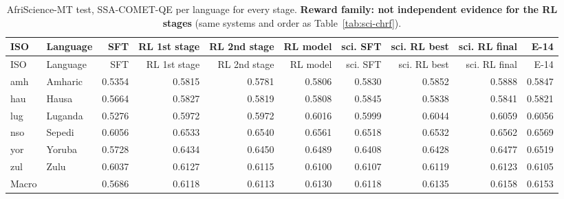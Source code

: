 {\scriptsize\setlength{\tabcolsep}{1.5pt}
\begin{longtable}{@{}llrrrrrrrr@{}}
\caption{AfriScience-MT test, SSA-COMET-QE per language for every stage. \textbf{Reward family: not independent evidence for the RL stages} (same systems and order as Table~\ref{tab:sci-chrf}).}\label{tab:sci-ssa}\\
\toprule
ISO & Language & SFT & RL 1st stage & RL 2nd stage & RL model & sci. SFT & sci. RL best & sci. RL final & E-14 \\
\midrule\endfirsthead
\toprule
ISO & Language & SFT & RL 1st stage & RL 2nd stage & RL model & sci. SFT & sci. RL best & sci. RL final & E-14 \\
\midrule\endhead
\midrule\endfoot
\bottomrule\endlastfoot
amh & Amharic & 0.5354 & 0.5815 & 0.5781 & 0.5806 & 0.5830 & 0.5852 & 0.5888 & 0.5847 \\
hau & Hausa & 0.5664 & 0.5827 & 0.5819 & 0.5808 & 0.5845 & 0.5838 & 0.5841 & 0.5821 \\
lug & Luganda & 0.5276 & 0.5972 & 0.5972 & 0.6016 & 0.5999 & 0.6044 & 0.6059 & 0.6056 \\
nso & Sepedi & 0.6056 & 0.6533 & 0.6540 & 0.6561 & 0.6518 & 0.6532 & 0.6562 & 0.6569 \\
yor & Yoruba & 0.5728 & 0.6434 & 0.6450 & 0.6489 & 0.6408 & 0.6428 & 0.6477 & 0.6519 \\
zul & Zulu & 0.6037 & 0.6127 & 0.6115 & 0.6100 & 0.6107 & 0.6119 & 0.6123 & 0.6105 \\
\midrule Macro &  & 0.5686 & 0.6118 & 0.6113 & 0.6130 & 0.6118 & 0.6135 & 0.6158 & 0.6153 \\
\end{longtable}}
